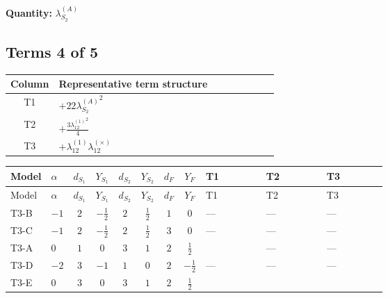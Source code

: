 \documentclass[8pt]{article}
\begin{document}
\begin{landscape}
\begin{longtable}{@{}llcccccc >{\raggedright\arraybackslash}p{0.21\linewidth} >{\raggedright\arraybackslash}p{0.21\linewidth} >{\raggedright\arraybackslash}p{0.21\linewidth}@{}}
\midrule
\bottomrule
\end{longtable}
\clearpage
\noindent\textbf{Quantity: }$\lambda_{S_2}^{(A)}$\par\smallskip
\subsection*{Terms 4 of 5}
\begin{center}
\begin{tabular}{@{}c >{\raggedright\arraybackslash}p{0.82\linewidth}@{}}
\toprule
Column & Representative term structure \\
\midrule
T1 & \(\displaystyle +22 {\lambda_{S_2}^{(A)}}^2\) \\
\midrule
T2 & \(\displaystyle +\frac{3 {\lambda_{12}^{(1)}}^2}{4}\) \\
\midrule
T3 & \(\displaystyle +{\lambda_{12}^{(1)}} {\lambda_{12}^{(\times)}}\) \\
\midrule
\bottomrule
\end{tabular}
\end{center}
\smallskip
\tiny
\begin{longtable}{@{}llcccccc >{\raggedright\arraybackslash}p{0.21\linewidth} >{\raggedright\arraybackslash}p{0.21\linewidth} >{\raggedright\arraybackslash}p{0.21\linewidth}@{}}
\toprule
Model & $\alpha$ & $d_{S_1}$ & $Y_{S_1}$ & $d_{S_2}$ & $Y_{S_2}$ & $d_F$ & $Y_F$ & T1 & T2 & T3 \\
\midrule
\endfirsthead
\toprule
Model & $\alpha$ & $d_{S_1}$ & $Y_{S_1}$ & $d_{S_2}$ & $Y_{S_2}$ & $d_F$ & $Y_F$ & T1 & T2 & T3 \\
\midrule
\endhead
T3-B & $-1$ & $2$ & $-\frac{1}{2}$ & $2$ & $\frac{1}{2}$ & $1$ & $0$ & --- & --- & --- \\
\midrule
T3-C & $-1$ & $2$ & $-\frac{1}{2}$ & $2$ & $\frac{1}{2}$ & $3$ & $0$ & --- & --- & --- \\
\midrule
T3-A & $0$ & $1$ & $0$ & $3$ & $1$ & $2$ & $\frac{1}{2}$ & \scriptsize\adjustbox{max width=\linewidth}{$\begin{gathered} +22 {\lambda_{S_2}^{(A)}}^2\end{gathered}$} & --- & --- \\
\midrule
T3-D & $-2$ & $3$ & $-1$ & $1$ & $0$ & $2$ & $-\frac{1}{2}$ & --- & --- & --- \\
\midrule
T3-E & $0$ & $3$ & $0$ & $3$ & $1$ & $2$ & $\frac{1}{2}$ & \scriptsize\adjustbox{max width=\linewidth}{$\begin{gathered} +22 {\lambda_{S_2}^{(A)}}^2\end{gathered}$} & \scriptsize\adjustbox{max width=\linewidth}{$\begin{gathered} +\frac{3 {\lambda_{12}^{(1)}}^2}{4}\end{gathered}$} & \scriptsize\adjustbox{max width=\linewidth}{$\begin{gathered} +{\lambda_{12}^{(1)}} {\lambda_{12}^{(\times)}}\end{gathered}$} \\

\end{longtable}
\end{landscape}
\end{document}

